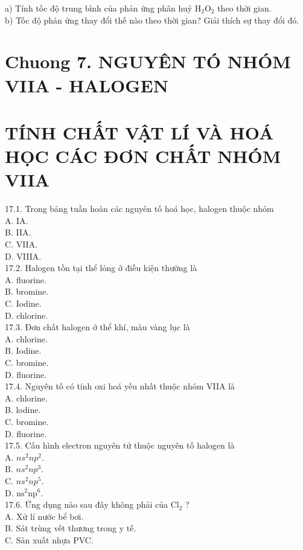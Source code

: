 \documentclass[10pt]{article}
\begin{document}
a) Tính tốc độ trung bình của phản ứng phân huỷ $\mathrm{H}_{2} \mathrm{O}_{2}$ theo thời gian.\\
b) Tốc độ phản ứng thay đổi thế nào theo thời gian? Giải thích sự thay đổi đó.

\section*{Chuong 7. NGUYÊN TÓ NHÓM VIIA - HALOGEN}
\section*{TÍNH CHẤT VẬT LÍ VÀ HOÁ HỌC CÁC ĐƠN CHẤT NHÓM VIIA}
17.1. Trong bảng tuần hoàn các nguyên tố hoá học, halogen thuộc nhóm\\
A. IA.\\
B. IIA.\\
C. VIIA.\\
D. VIIIA.\\
17.2. Halogen tồn tại thể lỏng ở điều kiện thường là\\
A. fluorine.\\
B. bromine.\\
C. Iodine.\\
D. chlorine.\\
17.3. Đơn chất halogen ở thể khí, màu vàng lục là\\
A. chlorine.\\
B. Iodine.\\
C. bromine.\\
D. fluorine.\\
17.4. Nguyên tố có tính oxi hoá yếu nhất thuộc nhóm VIIA là\\
A. chlorine.\\
B. lodine.\\
C. bromine.\\
D. fluorine.\\
17.5. Cấu hình electron nguyên tử thuộc nguyên tố halogen là\\
A. $n s^{2} n p^{2}$.\\
B. $n s^{2} n p^{3}$.\\
C. $n s^{2} n p^{5}$.\\
D. $\mathrm{ns}^{2} \mathrm{np}^{6}$.\\
17.6. Ứng dụng nào sau đây không phải của $\mathrm{Cl}_{2}$ ?\\
A. Xử lí nước bể bơi.\\
B. Sát trùng vết thương trong y tế.\\
C. Sản xuất nhựa PVC.\\
\end{document}
